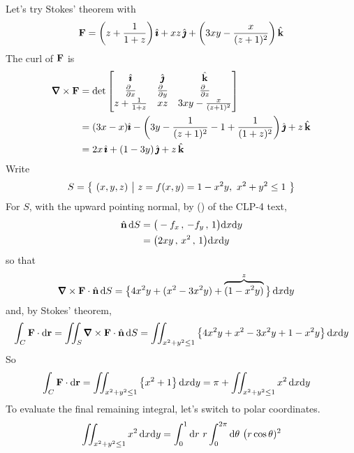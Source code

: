 \begin{solution}
 Let's try Stokes' theorem with
\begin{equation*}
\mathbf{F} = \left(z+\frac{1}{1+z}\right)\hat{\pmb{\imath}}
         +xz\,\hat{\pmb{\jmath}}
         +\left(3xy-\frac{x}{(z+1)^2}\right)\hat{\mathbf{k}}
\end{equation*}
The curl of $\mathbf{F}$ is
\begin{align*}
\vnabla\times\vF
&=\det\left[\begin{matrix}
\hi &\hj &\hk \\
\tfrac{\partial\hfill}{\partial x} & \tfrac{\partial\hfill}{\partial y} & 
                \tfrac{\partial\hfill}{\partial z} \\
z+\frac{1}{1+z} & xz & 3xy-\frac{x}{(z+1)^2}
\end{matrix}
\right] \\
&=(3x-x)\hi
  -\left(3y-\frac{1}{(z+1)^2}-1+\frac{1}{(1+z)^2}\right)\hj +z\,\hk \\
&=2x\,\hi +(1-3y)\,\hj+z\,\hk
\end{align*}
Write
\begin{equation*}
S=\big\{ \ (x,y,z)\ \big|\ z=f(x,y)=1-x^2y,\ x^2+y^2\le 1\ \big\}
\end{equation*}
For $S$, with the upward pointing normal, by ()
of the CLP-4 text,
\begin{align*}
\hat{\mathbf{n}}\,\mathrm{d}S &=\big(-f_x\,,\,-f_y\,,\, 1\big)\mathrm{d}x\mathrm{d}y \\
&=\big(2xy\,,\,x^2\,,\, 1\big)\mathrm{d}x\mathrm{d}y 
\end{align*}
so that
\begin{align*}
\vnabla\times\vF\cdot\hn\,\dee{S}
&=\big\{4x^2y + (x^2-3x^2y) +\overbrace{(1-x^2y)}^{z}\big\}\,\dee{x}\dee{y}
\end{align*}
and, by Stokes' theorem,
\begin{align*}
\int_C \vF\cdot\dee{\vr}
=\dblInt_S \vnabla\times\vF\cdot\hn\,\dee{S}
=\dblInt_{x^2+y^2\le 1}
  \big\{4x^2y + x^2-3x^2y + 1-x^2y\big\}\,\dee{x}\dee{y}
\end{align*}
So
\begin{align*}
\int_C \mathbf{F}\cdot\mathrm{d}\mathbf{r}
&=\iint_{x^2+y^2\le 1}
  \big\{x^2+ 1\big\}\,\mathrm{d}x\mathrm{d}y
=\pi + \iint_{x^2+y^2\le 1} x^2\,\mathrm{d}x\mathrm{d}y
\end{align*}
To evaluate the final remaining integral, let's switch to polar coordinates.
\begin{align*}
\dblInt_{x^2+y^2\le 1} x^2\,\dee{x}\dee{y}
&=\int_0^1\dee{r}\ r\int_0^{2\pi}\dee{\theta}\  \big(r\cos\theta)^2 \\

\end{align*}
\end{solution}
